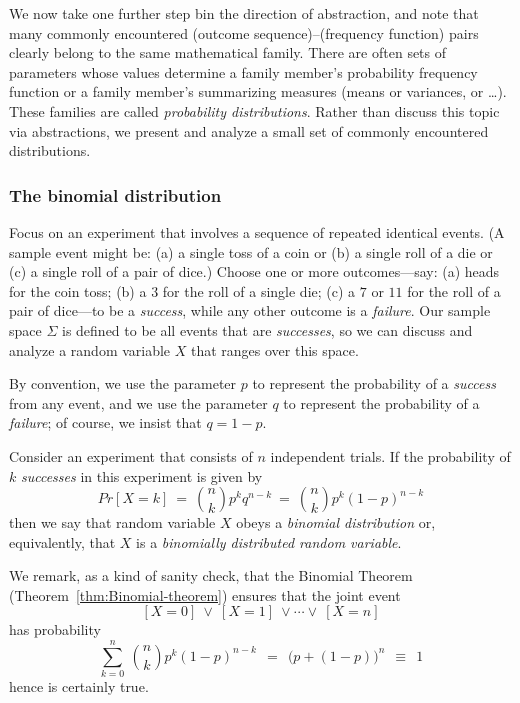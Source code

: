 We now take one further step bin the direction of abstraction, and note that many commonly encountered (outcome sequence)--(frequency function) pairs clearly belong to the same mathematical family.  There are often sets of parameters whose values determine a family member's probability frequency function
or a family member's summarizing measures (means or variances, or \ldots).  These families are called {\em probability distributions}.  Rather than discuss this topic via abstractions, we present and analyze a small set of commonly encountered distributions.

\subsubsection{The binomial distribution}
\label{sec:binomial-distribution}

Focus on an experiment that involves a sequence of repeated identical events.  (A sample event might be: (a) a single toss of a coin or (b) a single roll of a die or (c) a single roll of a pair of dice.)  Choose one or more outcomes---say: (a) {\sc heads} for the coin toss; (b) a $3$ for the roll of a single die; (c) a $7$ or $11$ for the roll of a pair of dice---to be a {\em success}, while any other outcome is a {\em failure}.  Our sample space $\Sigma$ is defined to be all events that are {\em successes}, so we can discuss and analyze a random variable $X$ that ranges over this space.

By convention, we use the parameter $p$ to represent the probability of a {\em success} from any event, and we use the parameter $q$ to represent the probability of a {\em failure}; of course, we insist that $q = 1-p$.

  
Consider an experiment that consists of $n$ independent trials.  If the probability of $k$ {\em successes} in this experiment is given by
\[ Pr[X=k] \ = \ {n \choose k} p^k q^{n-k} \ = \ {n \choose k} p^k (1-p)^{n-k} \]
then we say that random variable $X$ obeys a {\em binomial distribution} or, equivalently, that $X$ is a {\em binomially distributed random variable}.

We remark, as a kind of sanity check, that the Binomial Theorem (Theorem~\ref{thm:Binomial-theorem}) ensures that the joint event
\[ [X=0] \ \vee \ [X=1] \ \vee \cdots  \vee \ [X=n] \]
has probability
\[ \sum_{k=0}^n \ {n \choose k} p^k (1-p)^{n-k} \ \ = \ \  \big(p + (1-p) \big)^n \ \ \equiv \ \ 1 \] 
hence is certainly {\sc true}.

